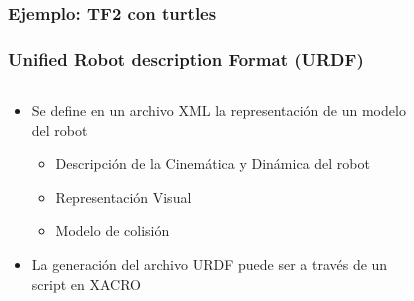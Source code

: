 \begin{frame}
	\frametitle{Ejemplo: TF2 con turtles}
	
	
	
\end{frame}

\begin{frame}
	\frametitle{Unified Robot description Format (URDF)}
 	\begin{columns}
		\begin{column}{0.5\textwidth}
			\begin{itemize}
				\item Se define en un archivo XML la representación de un modelo del robot
				\begin{itemize}
					\item Descripción de la Cinemática y Dinámica del robot
					\item Representación Visual
					\item Modelo de colisión
				\end{itemize}
				\item La generación del archivo URDF puede ser a través de un script en XACRO
			\end{itemize}
		\end{column}
		\begin{column}{0.5\textwidth}
			\begin{figure}[!h]
			\centering
			\end{figure}
		\end{column}
	\end{columns}
	
\end{frame}

